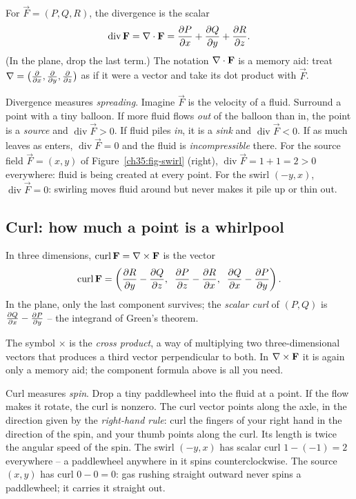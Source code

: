 \begin{definition}[Divergence]
\label{ch35:def-div}
For $\vec F=(P,Q,R)$, the divergence is the scalar
\[
  \operatorname{div}\mathbf{F} = \nabla\cdot\mathbf{F} = \frac{\partial P}{\partial x} + \frac{\partial Q}{\partial y} + \frac{\partial R}{\partial z}.
\]
(In the plane, drop the last term.) The notation $\nabla\cdot\mathbf{F}$ is a memory
aid: treat $\nabla = \big(\frac{\partial }{\partial x},\frac{\partial }{\partial y},\frac{\partial }{\partial z}\big)$ as if it were a vector
and take its dot product with $\vec F$.
\end{definition}

\begin{intuitionbox}
Divergence measures \emph{spreading}. Imagine $\vec F$ is the velocity of a fluid.
Surround a point with a tiny balloon. If more fluid flows \emph{out} of the balloon
than in, the point is a \emph{source} and $\operatorname{div}\vec F>0$. If fluid piles
\emph{in}, it is a \emph{sink} and $\operatorname{div}\vec F<0$. If as much leaves as
enters, $\operatorname{div}\vec F=0$ and the fluid is \emph{incompressible} there.
For the source field $\vec F=(x,y)$ of Figure~\ref{ch35:fig-swirl} (right),
$\operatorname{div}\vec F = 1+1 = 2 > 0$ everywhere: fluid is being created at
every point. For the
swirl $(-y,x)$, $\operatorname{div}\vec F = 0$: swirling moves fluid around but never
makes it pile up or thin out.
\end{intuitionbox}

\subsection{Curl: how much a point is a whirlpool}

\begin{definition}[Curl]
\label{ch35:def-curl}
In three dimensions, $\operatorname{curl}\mathbf{F} = \nabla\times\mathbf{F}$ is the vector
\[
  \operatorname{curl}\mathbf{F} =
  \left(\frac{\partial R}{\partial y}-\frac{\partial Q}{\partial z},\;\; \frac{\partial P}{\partial z}-\frac{\partial R}{\partial x},\;\; \frac{\partial Q}{\partial x}-\frac{\partial P}{\partial y}\right).
\]
In the plane, only the last component survives; the \emph{scalar curl} of
$(P,Q)$ is $\frac{\partial Q}{\partial x}-\frac{\partial P}{\partial y}$ -- the integrand of Green's theorem.
\end{definition}

The symbol $\times$ is the \emph{cross product}, a way of multiplying two
three-dimensional vectors that produces a third vector perpendicular to both. In
$\nabla\times\mathbf{F}$ it is again only a memory aid; the component formula above is
all you need.

\begin{intuitionbox}
Curl measures \emph{spin}. Drop a tiny paddlewheel into the fluid at a point. If
the flow makes it rotate, the curl is nonzero. The curl vector points along the
axle, in the direction given by the \emph{right-hand rule}: curl the fingers of
your right hand in the direction of the spin, and your thumb points along the curl.
Its length is twice the angular speed of the spin. The
swirl $(-y,x)$ has scalar curl $1-(-1)=2$ everywhere -- a paddlewheel anywhere in
it spins counterclockwise. The source $(x,y)$ has curl $0-0=0$: gas rushing
straight outward never spins a paddlewheel; it carries it straight out.
\end{intuitionbox}

